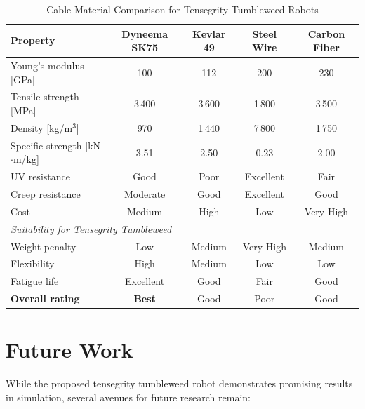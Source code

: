 \begin{table}[htbp]
\centering
\caption{Cable Material Comparison for Tensegrity Tumbleweed Robots}
\label{tab:material_comparison}
\begin{tabular}{l c c c c}
\hline
\textbf{Property} & \textbf{Dyneema SK75} & \textbf{Kevlar 49} & \textbf{Steel Wire} & \textbf{Carbon Fiber} \\
\hline
Young's modulus [GPa]         & 100   & 112   & 200   & 230 \\
Tensile strength [MPa]        & 3\,400 & 3\,600 & 1\,800 & 3\,500 \\
Density [kg/m$^3$]            & 970   & 1\,440 & 7\,800 & 1\,750 \\
Specific strength [kN$\cdot$m/kg] & 3.51  & 2.50  & 0.23  & 2.00 \\
UV resistance                 & Good  & Poor  & Excellent & Fair \\
Creep resistance              & Moderate & Good & Excellent & Good \\
Cost                          & Medium & High & Low   & Very High \\
\hline
\multicolumn{5}{l}{\textit{Suitability for Tensegrity Tumbleweed}} \\
\hline
Weight penalty                & Low   & Medium & Very High & Medium \\
Flexibility                   & High  & Medium & Low   & Low \\
Fatigue life                  & Excellent & Good & Fair & Good \\
\textbf{Overall rating}       & \textbf{Best} & Good & Poor & Good \\
\hline
\end{tabular}
\end{table}



\section{Future Work}
\label{sec:future_work}

While the proposed tensegrity tumbleweed robot demonstrates promising results
in simulation, several avenues for future research remain:

